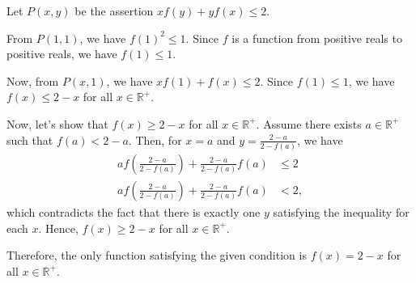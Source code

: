 Let $P(x,y)$ be the assertion $xf(y) + yf(x) \leq 2$.

From $P(1,1)$, we have $f(1)^2 \leq 1$. Since $f$ is a function from positive reals to positive reals, we have $f(1) \leq 1$.

Now, from $P(x,1)$, we have $xf(1) + f(x) \leq 2$. Since $f(1) \leq 1$, we have $f(x) \leq 2 - x$ for all $x \in \mathbb{R}^+$.

Now, let's show that $f(x) \geq 2 - x$ for all $x \in \mathbb{R}^+$. Assume there exists $a \in \mathbb{R}^+$ such that $f(a) < 2 - a$. Then, for $x = a$ and $y = \frac{2-a}{2-f(a)}$, we have
\begin{align*}
af\left(\frac{2-a}{2-f(a)}\right) + \frac{2-a}{2-f(a)}f(a) &\leq 2 \\
af\left(\frac{2-a}{2-f(a)}\right) + \frac{2-a}{2-f(a)}f(a) &< 2,
\end{align*}
which contradicts the fact that there is exactly one $y$ satisfying the inequality for each $x$. Hence, $f(x) \geq 2 - x$ for all $x \in \mathbb{R}^+$.

Therefore, the only function satisfying the given condition is $f(x) = 2 - x$ for all $x \in \mathbb{R}^+$.

